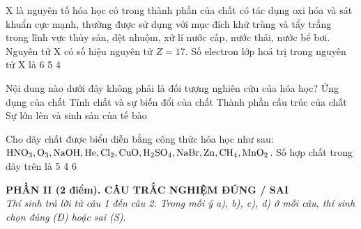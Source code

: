 \documentclass[11pt,a4paper]{article}
\begin{document}
\begin{ex}
X là nguyên tố hóa học có trong thành phần của chất có tác dụng oxi hóa và sát khuẩn cực mạnh, thường được sử dụng với mục đích khử trùng và tẩy trắng trong lĩnh vực thủy sản, dệt nhuộm, xử lí nước cấp, nước thải, nước bể bơi. Nguyên tử X có số hiệu nguyên tử $Z = 17$. Số electron lớp hoá trị trong nguyên tử X là
\choice
{}
{6}
{5}
{4}

\end{ex}
\begin{ex}
Nội dung nào dưới đây không phải là đối tượng nghiên cứu của hóa học?
\choice
{Ứng dụng của chất}
{Tính chất và sự biến đổi của chất}
{Thành phần cấu trúc của chất}
{\True Sự lớn lên và sinh sản của tế bào}

\end{ex}
\begin{ex}
Cho dãy chất được biểu diễn bằng công thức hóa học như sau: $\ce{HNO3, O3, NaOH, He, Cl2, CuO, H2SO4, NaBr, Zn, CH4, MnO2}$. Số hợp chất trong dãy trên là
\choice
{}
{5}
{4}
{6}

\end{ex}
\vspace{4pt}
\noindent
{\color{mainGreen}\textbf{\large PHẦN II (2 điểm). CÂU TRẮC NGHIỆM ĐÚNG / SAI}}\\
\textit{\small Thí sinh trả lời từ câu 1 đến câu 2. Trong mỗi ý a), b), c), d) ở mỗi câu, thí sinh chọn đúng (Đ) hoặc sai (S).}
\vspace{2pt}
\end{document}
